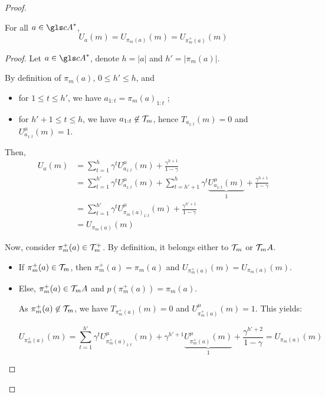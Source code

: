 \begin{proof}
	\begin{lemma}
		\begin{leftbar}[lemmabar]
		\label{lemma:value-conservation}
		For all $a \in \cA^*$,
		\begin{equation*}
		U_a(m) = U_{\pi_m(a)}(m) = U_{\pi_m^+(a)}(m)
		\end{equation*}
		\end{leftbar}
	\end{lemma}
	\begin{proof}
		Let $a \in \cA^*$, denote $h=|a|$ and $h'=|\pi_m(a)|$.
		
		By definition of $\pi_m(a)$, $0 \leq h' \leq h$, and
		\begin{itemize}
			\item for $1\leq t \leq h'$, we have $a_{1:t} = {\pi_m(a)}_{1:t}$ ;
			\item for $h'+1\leq t \leq h$, we have $a_{1:t} \not \in \mathcal{T}_m$, hence $T_{a_{1:t}}(m) = 0$ and $U^{\mu}_{a_{1:t}}(m) = 1$.
		\end{itemize}
		Then,
		\begin{align*}
		U_a(m) &= \sum_{t=1}^h \gamma^t U^{\mu}_{a_{1:t}}(m) + \frac{\gamma^{h+1}}{1-\gamma} \\
		&= \sum_{t=1}^{h'} \gamma^t U^{\mu}_{a_{1:t}}(m) + \sum_{t=h'+1}^h \gamma^t \underbrace{U^{\mu}_{a_{1:t}}(m)}_1 + \frac{\gamma^{h+1}}{1-\gamma} \\
		&= \sum_{t=1}^{h'} \gamma^t U^{\mu}_{{\pi_m(a)}_{1:t}}(m) + \frac{\gamma^{h'+1}}{1-\gamma} \\
		&= U_{\pi_m(a)}(m)
		\end{align*}
		
		Now, consider $\pi_m^+(a) \in \mathcal{T}_m^+$.
		By definition, it belongs either to $\mathcal{T}_m$ or $\mathcal{T}_m A$.
		\begin{itemize}
			\item If $\pi_m^+(a) \in \mathcal{T}_m$, then $\pi_m^+(a) = \pi_m(a)$ and $U_{\pi_m^+(a)}(m) = U_{\pi_m(a)}(m)$.
			\item Else, $\pi_m^+(a) \in \mathcal{T}_m A$ and $p(\pi_m^+(a)) = \pi_m(a)$.
			
			As $\pi_m^+(a) \not \in \mathcal{T}_m$, we have $T_{\pi_m^+(a)}(m) = 0$ and $U^{\mu}_{\pi_m^+(a)}(m) = 1$.
			This yields:
			
			\begin{equation*}
			U_{\pi_m^+(a)}(m) = \sum_{t=1}^{h'} \gamma^t U^{\mu}_{{\pi_m^+(a)}_{1:t}}(m) + \gamma^{h'+1} \underbrace{U^{\mu}_{{\pi_m^+(a)}}(m)}_1 + \frac{\gamma^{h'+2}}{1-\gamma} = U_{\pi_m(a)}(m)
			\end{equation*}
			

\end{itemize}
\end{proof}
\end{proof}
